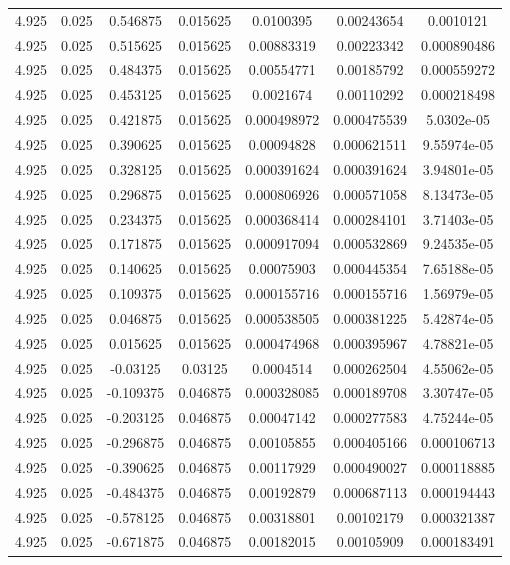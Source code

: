 \begin{flushleft}
\begin{longtable}{ccccccc}
4.925 & 0.025 & 0.546875 & 0.015625 & 0.0100395 & 0.00243654 & 0.0010121  \\ 
4.925 & 0.025 & 0.515625 & 0.015625 & 0.00883319 & 0.00223342 & 0.000890486  \\ 
4.925 & 0.025 & 0.484375 & 0.015625 & 0.00554771 & 0.00185792 & 0.000559272  \\ 
4.925 & 0.025 & 0.453125 & 0.015625 & 0.0021674 & 0.00110292 & 0.000218498  \\ 
4.925 & 0.025 & 0.421875 & 0.015625 & 0.000498972 & 0.000475539 & 5.0302e-05  \\ 
4.925 & 0.025 & 0.390625 & 0.015625 & 0.00094828 & 0.000621511 & 9.55974e-05  \\ 
4.925 & 0.025 & 0.328125 & 0.015625 & 0.000391624 & 0.000391624 & 3.94801e-05  \\ 
4.925 & 0.025 & 0.296875 & 0.015625 & 0.000806926 & 0.000571058 & 8.13473e-05  \\ 
4.925 & 0.025 & 0.234375 & 0.015625 & 0.000368414 & 0.000284101 & 3.71403e-05  \\ 
4.925 & 0.025 & 0.171875 & 0.015625 & 0.000917094 & 0.000532869 & 9.24535e-05  \\ 
4.925 & 0.025 & 0.140625 & 0.015625 & 0.00075903 & 0.000445354 & 7.65188e-05  \\ 
4.925 & 0.025 & 0.109375 & 0.015625 & 0.000155716 & 0.000155716 & 1.56979e-05  \\ 
4.925 & 0.025 & 0.046875 & 0.015625 & 0.000538505 & 0.000381225 & 5.42874e-05  \\ 
4.925 & 0.025 & 0.015625 & 0.015625 & 0.000474968 & 0.000395967 & 4.78821e-05  \\ 
4.925 & 0.025 & -0.03125 & 0.03125 & 0.0004514 & 0.000262504 & 4.55062e-05  \\ 
4.925 & 0.025 & -0.109375 & 0.046875 & 0.000328085 & 0.000189708 & 3.30747e-05  \\ 
4.925 & 0.025 & -0.203125 & 0.046875 & 0.00047142 & 0.000277583 & 4.75244e-05  \\ 
4.925 & 0.025 & -0.296875 & 0.046875 & 0.00105855 & 0.000405166 & 0.000106713  \\ 
4.925 & 0.025 & -0.390625 & 0.046875 & 0.00117929 & 0.000490027 & 0.000118885  \\ 
4.925 & 0.025 & -0.484375 & 0.046875 & 0.00192879 & 0.000687113 & 0.000194443  \\ 
4.925 & 0.025 & -0.578125 & 0.046875 & 0.00318801 & 0.00102179 & 0.000321387  \\ 
4.925 & 0.025 & -0.671875 & 0.046875 & 0.00182015 & 0.00105909 & 0.000183491  \\ 

\end{longtable}
\end{flushleft}
